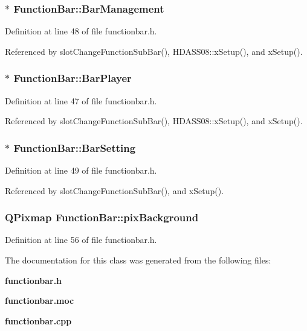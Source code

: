\subsubsection{$\ast$ {\bf Function\-Bar::Bar\-Management}}\label{classFunctionBar_FunctionBaro4}




Definition at line 48 of file functionbar.h.

Referenced by slot\-Change\-Function\-Sub\-Bar(), HDASS08::x\-Setup(), and x\-Setup().
\subsubsection{$\ast$ {\bf Function\-Bar::Bar\-Player}}\label{classFunctionBar_FunctionBaro3}




Definition at line 47 of file functionbar.h.

Referenced by slot\-Change\-Function\-Sub\-Bar(), HDASS08::x\-Setup(), and x\-Setup().
\subsubsection{$\ast$ {\bf Function\-Bar::Bar\-Setting}}\label{classFunctionBar_FunctionBaro5}




Definition at line 49 of file functionbar.h.

Referenced by slot\-Change\-Function\-Sub\-Bar(), and x\-Setup().
\subsubsection{\setlength{\rightskip}{0pt plus 5cm}QPixmap {\bf Function\-Bar::pix\-Background}\hspace{0.3cm}{\tt  [private]}}\label{classFunctionBar_FunctionBarr0}




Definition at line 56 of file functionbar.h.

The documentation for this class was generated from the following files:\begin{CompactItemize}
\item 
{\bf functionbar.h}\item 
{\bf functionbar.moc}\item 
{\bf functionbar.cpp}\end{CompactItemize}
